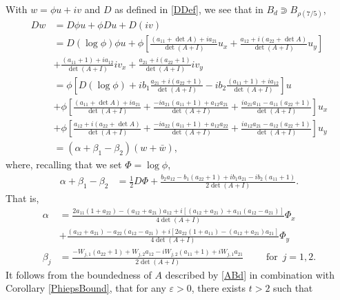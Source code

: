 \documentclass[12pt,reqno]{amsart}
\theoremstyle{plain}
\theoremstyle{definition}
\newcommand{\eps}{\varepsilon}
\newcommand{\al}{\alpha}
\newcommand{\be}{\beta}
\newcommand{\brac}[1]{\left[#1\right]}
\newcommand{\pr}[1]{\left( #1 \right) }
\begin{document}
With $w = \phi u + i v$ and $D$ as defined in \eqref{DDef}, we see that in $B_d \Supset B_{\rho\pr{7/5}}$,
\begin{align}
D w &=  D \phi u + \phi Du + D (i v) \nonumber \\
&= D\pr{ \log \phi} \phi u 
+ \phi \brac{\frac{ \pr{a_{11} + \det A} + i {a_{21}} }{\det\pr{A + I}}u_x 
+ \frac{ {a_{12}} + i \pr{a_{22} + \det A}}{ \det\pr{A + I}} u_y } \nonumber \\
&+ \frac{\pr{a_{11} + 1} + i {a_{12}}}{\det\pr{A + I}} i v_x
+ \frac{ {a_{21}} + i\pr{a_{22}  + 1} }{ \det\pr{A + I}} i v_y \nonumber \\
&= \phi \brac{D\pr{ \log \phi} +  i  b_1\frac{ {a_{21}} + i\pr{a_{22}  + 1} }{ \det\pr{A + I}} - i b_2 \frac{\pr{a_{11} + 1} + i {a_{12}}}{\det\pr{A + I}} } u \nonumber \\
&+ \phi \brac{\frac{ \pr{a_{11} + \det A} + i {a_{21}} }{\det\pr{A + I}} + \frac{-ia_{21}\pr{a_{11} + 1} + {a_{12}a_{21}}}{\det\pr{A + I}} + \frac{ i{a_{21}}a_{11}  -a_{11}  \pr{a_{22}  + 1} }{ \det\pr{A + I}} } u_x \nonumber \\
&+ \phi \brac{ \frac{ {a_{12}} + i \pr{a_{22} + \det A}}{ \det\pr{A + I}}+ \frac{-ia_{22}\pr{a_{11} + 1} + {a_{12}a_{22}}}{\det\pr{A + I}} + \frac{ ia_{12} {a_{21}} - a_{12}\pr{a_{22}  + 1} }{ \det\pr{A + I}}  } u_y \nonumber \\
&= \pr{\al + \be_1 - \be_2} \pr{w + \bar w},
\label{diffEq}
\end{align}
where, recalling that we set $\Phi = \log \phi$,
\begin{align*}
\al + \be_1 - \be_2 &= \frac 1 2 D \Phi 
+ \frac{ b_2 a_{12}- b_1\pr{a_{22}  + 1} + i b_1 a_{21}- i b_2\pr{a_{11} + 1} }{ 2\det\pr{A + I}}.
\end{align*}
That is, 
\begin{align}
\al &=\frac{ 2a_{11} \pr{1 + a_{22} } - \pr{a_{12}+a_{21}} a_{12} 
+ i \brac{\pr{a_{12} + a_{21}} + a_{11}\pr{a_{12}- a_{21}}}}{4\det\pr{A + I}}\Phi_x  \nonumber \\
&+ \frac{ \pr{a_{12} + a_{21}} - a_{22}\pr{a_{12}- a_{21}} + i \brac{2a_{22}\pr{1 + a_{11}} - \pr{a_{12}+ a_{21}} a_{21}}}{ 4\det\pr{A + I}} \Phi_y 
\label{alDef} \\
\be_j  &= \frac{- W_{j,1} \pr{a_{22}  + 1} + W_{j,2} a_{12} - i W_{j,2} \pr{a_{11} + 1} +  i W_{j,1} a_{21}}{ 2\det\pr{A + I}} \qquad \text{ for } \, j = 1, 2.
\label{beDef}
\end{align}
It follows from the boundedness of $A$ described by \eqref{ABd} in combination with Corollary \ref{PhiepsBound}, that for any $\eps > 0$, there exists $t > 2$ such that
\end{document}
